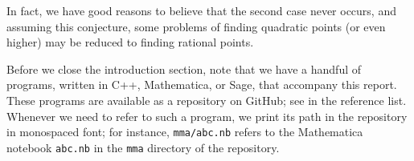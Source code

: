 In fact, we have good reasons to believe that the second case never
occurs, and assuming this conjecture, some problems of finding
quadratic points (or even higher) may be reduced to finding rational
points.

Before we close the introduction section, note that we have a handful
of programs, written in C++, Mathematica, or Sage, that accompany this
report. These programs are available as a repository on GitHub; see
\cite{src} in the reference list. Whenever we need to refer to such a
program, we print its path in the repository in monospaced font; for
instance, \texttt{mma/abc.nb} refers to the Mathematica notebook
\texttt{abc.nb} in the \texttt{mma} directory of the repository.

